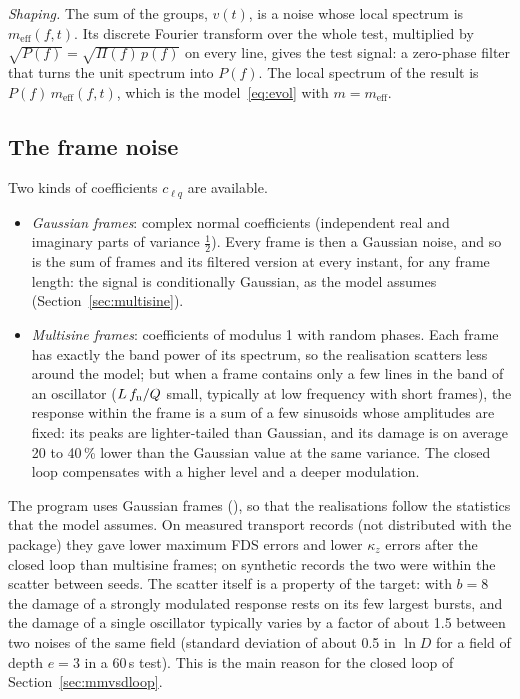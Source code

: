 \emph{Shaping.} The sum of the groups, $v(t)$, is a noise whose local spectrum is
$m_{\mathrm{eff}}(f,t)$. Its discrete Fourier transform over the whole test, multiplied by
$\sqrt{P(f)} = \sqrt{\Pi(f)\,p(f)}$ on every line, gives the test signal: a zero-phase filter that
turns the unit spectrum into $P(f)$. The local spectrum of the result is $P(f)\,m_{\mathrm{eff}}(f,t)$,
which is the model~\eqref{eq:evol} with $m = m_{\mathrm{eff}}$.

\subsection{The frame noise}\label{sec:framenoise}

Two kinds of coefficients $c_{\ell q}$ are available.
\begin{itemize}
\item \emph{Gaussian frames}: complex normal coefficients (independent real and imaginary parts of
variance $\tfrac12$). Every frame is then a Gaussian noise, and so is the sum of frames and its
filtered version at every instant, for any frame length: the signal is conditionally Gaussian, as
the model assumes (Section~\ref{sec:multisine}).
\item \emph{Multisine frames}: coefficients of modulus 1 with random phases. Each frame has exactly
the band power of its spectrum, so the realisation scatters less around the model; but when a frame
contains only a few lines in the band of an oscillator ($L\,f_{\mathrm{n}}/Q$ small, typically at low frequency
with short frames), the response within the frame is a sum of a few sinusoids whose amplitudes are
fixed: its peaks are lighter-tailed than Gaussian, and its damage is on average 20 to 40\,\% lower than the
Gaussian value at the same variance. The closed loop compensates with a higher level and a deeper
modulation.
\end{itemize}
The program uses Gaussian frames (), so that the realisations
follow the statistics that the model assumes. On measured transport records (not distributed with
the package) they gave lower maximum FDS errors and lower $\kappa_z$ errors after the closed loop than
multisine frames; on synthetic records the two were within the scatter between seeds. The scatter
itself is a property of the target: with $b = 8$ the damage of a strongly modulated response rests on
its few largest bursts, and the damage of a single oscillator typically varies by a factor of about
1.5 between two noises of the same field (standard deviation of about 0.5 in $\ln D$ for a field of
depth $e = 3$ in a 60\,s test). This is the main reason for the closed loop of
Section~\ref{sec:mmvsdloop}.

